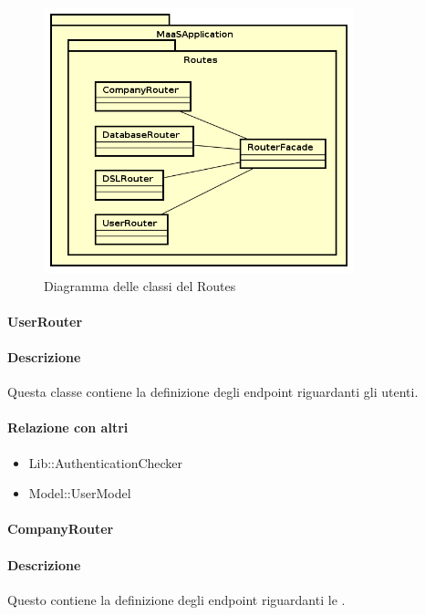 \begin{figure}[H]
\centering
\includegraphics[width=0.8\textwidth]{res/sections/backend/routes.png}
\caption{Diagramma delle classi del  Routes}
\end{figure}

\paragraph{UserRouter}
\paragraph*{Descrizione}
Questa classe contiene la definizione degli endpoint riguardanti gli utenti. 

\paragraph*{Relazione con altri }
\begin{itemize}
\item Lib::AuthenticationChecker
\item Model::UserModel
\end{itemize}

\paragraph{CompanyRouter}
\paragraph*{Descrizione}
Questo  contiene la definizione degli endpoint riguardanti le .

